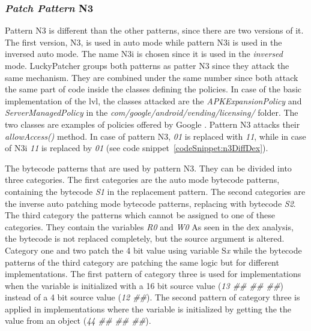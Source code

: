 \subsubsection{\textit{Patch Pattern} N3}
Pattern N3 is different than the other patterns, since there are two versions of it.
The first version, N3, is used in auto mode while pattern N3i is used in the inversed auto mode.
The name N3i is chosen since it is used in the \textit{inversed} mode.
LuckyPatcher groups both patterns as patter N3 since they attack the same mechanism.
They are combined under the same number since both attack the same part of code inside the classes defining the policies.
In case of the basic implementation of the \gls{lvl}, the classes attacked are the \textit{APKExpansionPolicy} and \textit{ServerManagedPolicy} in the  \textit{com/google/android/vending/licensing/} folder.
The two classes are examples of policies offered by Google \cite{developersLicensingReference}.
Pattern N3 attacks their \textit{allowAccess()} method.
\newline
In case of pattern N3, \textit{01} is replaced with \textit{11}, while in case of N3i \textit{11} is replaced by \textit{01} (see code snippet~\ref{codeSnippet:n3DiffDex}).
\newline

The bytecode patterns that are used by pattern N3.
They can be divided into three categories.
The first categories are the auto mode bytecode patterns, containing the bytecode \textit{S1} in the replacement pattern.
The second categories are the inverse auto patching mode bytecode patterns, replacing with bytecode \textit{S2}.
The third category the patterns which cannot be assigned to one of these categories.
They contain the variables \textit{R0} and \textit{W0}
\newline
As seen in the dex analysis, the bytecode is not replaced completely, but the source argument is altered.
Category one and two patch the 4 bit value using variable S\textit{x} while the bytecode patterns of the third category are patching the same logic but for different implementations.
The first pattern of category three is used for implementations when the variable is initialized  with a 16 bit source value (\textit{13 \#\# \#\# \#\#}) instead of a 4 bit source value (\textit{12 \#\#}).
The second pattern of category three is applied in implementations where the variable is initialized by getting the the value from an object (\textit{44 \#\# \#\# \#\#}).
